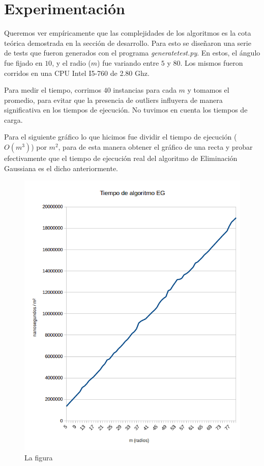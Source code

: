 \section{Experimentación}

Queremos ver empíricamente que las complejidades de los algoritmos es la cota teórica demostrada en la sección de desarrollo. Para esto se diseñaron una serie de tests que fueron generados con el programa \textit{generatetest.py}. En estos, el ángulo fue fijado en $10$, y el radio ($m$) fue variando entre $5$ y $80$. Los mismos fueron corridos en una CPU Intel I5-760 de 2.80 Ghz.

Para medir el tiempo, corrimos $40$ instancias para cada $m$ y tomamos el promedio, para evitar que la presencia de outliers influyera de manera significativa en los tiempos de ejecución. No tuvimos en cuenta los tiempos de carga.

Para el siguiente gráfico lo que hicimos fue dividir el tiempo de ejecución ($O(m^{3})$) por $m^{2}$, para de esta manera obtener el gráfico de una recta y probar efectivamente que el tiempo de ejecución real del algoritmo de Eliminación Gaussiana es el dicho anteriormente.

\begin{figure}[h]
  \center
  \includegraphics[scale=0.8]{imagenes/tiempoEGdivididoM2.png}
  \caption{La figura}
  \label{fig:egdivididom2}
\end{figure}

